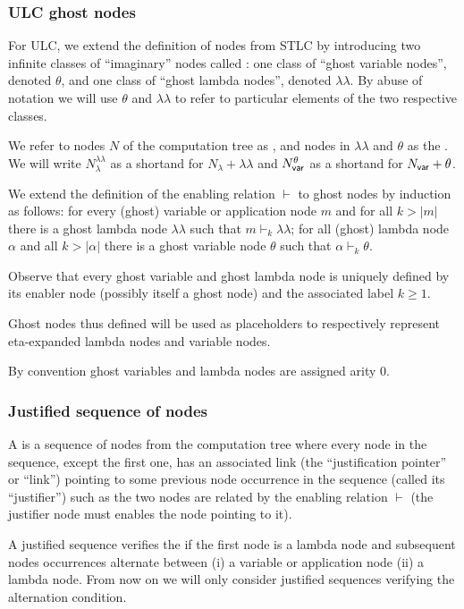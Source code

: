 \documentclass{article}
\theoremstyle{definition}
\newcommand\Nodes{N}%
\newcommand\NodesVar{N_{\sf var}}%
\newcommand\NodesLmd{N_\lambda}%
\newcommand{\ghostlmd}{{\lambda\!\!\lambda}}
\newcommand{\ghostvar}{\theta}
\newcommand{\enables}{\vdash}
\begin{document}
\subsubsection{ULC ghost nodes}
For ULC, we extend the definition of nodes from STLC by introducing two infinite classes of ``imaginary'' nodes called :
one class of ``ghost variable nodes'', denoted $\ghostvar$, and one class of ``ghost lambda nodes'', denoted $\ghostlmd$. By abuse of notation we will use $\ghostvar$ and $\ghostlmd$ to refer to particular elements of the two respective classes.

We refer to nodes $\Nodes$ of the computation tree as , and nodes in $\ghostlmd$ and $\ghostvar$ as the . We will write $\NodesLmd^\ghostlmd$ as a shortand for $\NodesLmd + \ghostlmd$
and $\NodesVar^\ghostvar$ as a shortand for $\NodesVar + \ghostvar$.

We extend the definition of the enabling relation $\enables$ to ghost nodes by induction as follows: for every (ghost) variable or application node $m$ and for all $k>|m|$ there is a ghost lambda node $\ghostlmd$ such that $m \enables_k \ghostlmd$; for all (ghost) lambda node $\alpha$ and all $k>|\alpha|$ there is a ghost variable node $\ghostvar$ such that $\alpha \enables_k \ghostvar$.

Observe that every ghost variable and ghost lambda node is uniquely defined by its enabler node (possibly itself a ghost node) and the associated label $k\geq 1$.

Ghost nodes thus defined will be used as placeholders to respectively represent eta-expanded lambda nodes and variable nodes.

By convention ghost variables and lambda nodes are assigned arity $0$.

\subsubsection{Justified sequence of nodes}

A  is a sequence of nodes from the computation tree where every node in the sequence, except the first one, has an associated link (the ``justification pointer'' or ``link'') pointing to some previous node occurrence in the sequence (called its ``justifier'') such as the two nodes are related by the enabling relation $\enables$ (the justifier node must enables the node pointing to it).

A justified sequence verifies the  if the first node is a lambda node and subsequent nodes occurrences alternate between (i) a variable or application node (ii) a lambda node. From now on we will only consider justified sequences verifying the alternation condition.
\end{document}
